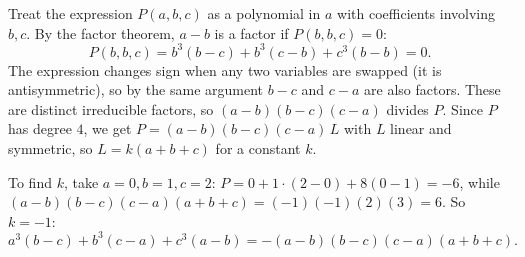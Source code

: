 Treat the expression \(P(a,b,c)\) as a polynomial in \(a\) with coefficients involving \(b,c\). By the factor theorem, \(a-b\) is a factor if \(P(b,b,c)=0\):
\[
P(b,b,c)=b^3(b-c)+b^3(c-b)+c^3(b-b)=0.
\]
The expression changes sign when any two variables are swapped (it is antisymmetric), so by the same argument \(b-c\) and \(c-a\) are also factors. These are distinct irreducible factors, so \((a-b)(b-c)(c-a)\) divides \(P\). Since \(P\) has degree \(4\), we get \(P=(a-b)(b-c)(c-a)\,L\) with \(L\) linear and symmetric, so \(L=k(a+b+c)\) for a constant \(k\).

To find \(k\), take \(a=0,b=1,c=2\): \(P=0+1\cdot(2-0)+8(0-1)=-6\), while \((a-b)(b-c)(c-a)(a+b+c)=(-1)(-1)(2)(3)=6\). So \(k=-1\):
\[
\boxed{a^3(b-c)+b^3(c-a)+c^3(a-b)=-(a-b)(b-c)(c-a)(a+b+c)}.
\]
